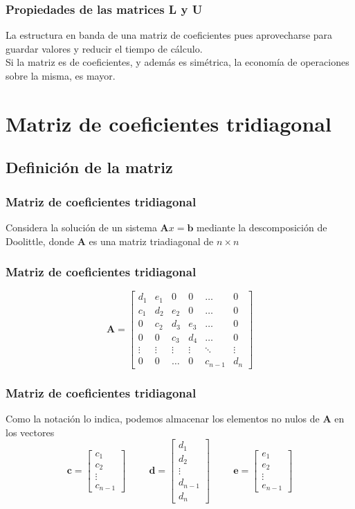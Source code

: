 \begin{frame}
\frametitle{Propiedades de las matrices \textbf{L} y \textbf{U}}
La estructura en banda de una matriz de coeficientes pues aprovecharse para guardar valores y reducir el tiempo de cálculo. 
\\
\medskip
Si la matriz es de coeficientes, y además es simétrica, la economía de operaciones sobre la misma, es mayor.
\end{frame}
\section{Matriz de coeficientes tridiagonal}
\subsection*{Definición de la matriz}
\begin{frame}
\frametitle{Matriz de coeficientes tridiagonal}
Considera la solución de un sistema $\mathbf{A}x = \mathbf{b}$ mediante la descomposición de Doolittle, donde $\mathbf{A}$ es una matriz triadiagonal de $n\times n$
\end{frame}
\begin{frame}
\frametitle{Matriz de coeficientes tridiagonal}
\[ \mathbf{A} =  \begin{bmatrix}
d_{1} & e_{1} & 0 & 0 & \ldots & 0 \\
c_{1} & d_{2} & e_{2} & 0 & \ldots & 0 \\
0 & c_{2} & d_{3} & e_{3} & \ldots & 0 \\
0 & 0 & c_{3}& d_{4} & \ldots & 0 \\
\vdots & \vdots & \vdots & \vdots & \ddots & \vdots \\
0 & 0 & \ldots & 0 & c_{n-1} & d_{n}
\end{bmatrix} \]
\end{frame}
\begin{frame}
\frametitle{Matriz de coeficientes tridiagonal}
Como la notación lo indica, podemos almacenar los elementos no nulos de $\mathbf{A}$ en los vectores
\[ \mathbf{c} = \begin{bmatrix}
c_{1} \\
c_{2} \\
\vdots \\
c_{n-1}
\end{bmatrix}
\hspace{1cm}
\mathbf{d} = \begin{bmatrix}
d_{1} \\
d_{2} \\
\vdots \\
d_{n-1} \\
d_{n}
\end{bmatrix}
\hspace{1cm}
\mathbf{e} = \begin{bmatrix}
e_{1} \\
e_{2} \\
\vdots \\
e_{n-1}
\end{bmatrix} \]
\end{frame}
